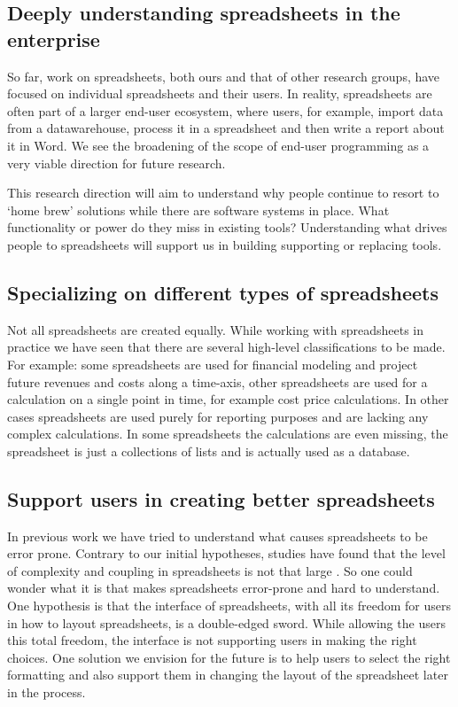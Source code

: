 \documentclass[conference]{IEEEtran}
\begin{document}
\subsection{Deeply understanding spreadsheets in the enterprise}
So far, work on spreadsheets, both ours and that of other research groups, have focused on individual spreadsheets and their users. In reality, spreadsheets are often part of a larger end-user ecosystem, where users, for example, import data from a datawarehouse, process it in a spreadsheet and then write a report about it in Word. We see the broadening of the scope of end-user programming as a very viable direction for future research. 

This research direction will aim to understand why people continue to resort to `home brew' solutions while there are software systems in place. What functionality or power do they miss in existing tools? Understanding what drives people to spreadsheets will support us in building supporting or replacing tools.

\subsection{Specializing on different types of spreadsheets}
Not all spreadsheets are created equally. While working with spreadsheets in practice we have seen that there are several high-level classifications to be made. For example: some spreadsheets are used for financial modeling and project future revenues and costs along a time-axis, other spreadsheets are used for a calculation on a single point in time, for example cost price calculations. In other cases spreadsheets are used purely for reporting purposes and are lacking any complex calculations. In some spreadsheets the calculations are even missing, the spreadsheet is just a collections of lists and is actually used as a database.

\subsection{Support users in creating better spreadsheets}
In previous work we have tried to understand what causes spreadsheets to be error prone. Contrary to our initial hypotheses, studies have found that the level of complexity and coupling in spreadsheets is not that large . So one could wonder what it is that makes spreadsheets error-prone and hard to understand. One hypothesis is that the interface of spreadsheets, with all its freedom for users in how to layout spreadsheets, is a double-edged sword. While allowing the users this total freedom, the interface is not supporting users in making the right choices. One solution we envision for the future is to help users to select the right formatting and also support them in changing the layout of the spreadsheet later in the process. 
\end{document}

